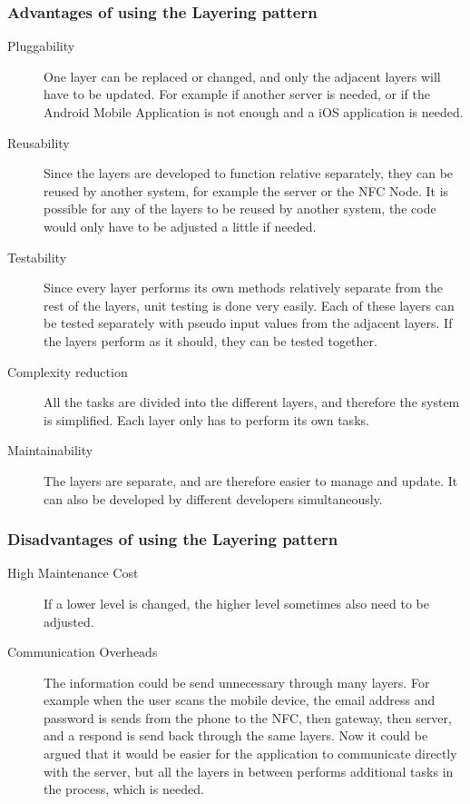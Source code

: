 \subsubsection{Advantages of using the Layering pattern}
\begin{description}
\item[Pluggability] One layer can be replaced or changed, and only the adjacent layers will have to be updated. For example if another server is needed, or if the Android Mobile Application is not enough and a iOS application is needed.
\item[Reusability] Since the layers are developed to function relative separately, they can be reused by another system, for example the server or the NFC Node. It is possible for any of the layers to be reused by another system, the code would only have to be adjusted a little if needed.  
\item[Testability] Since every layer performs its own methods relatively separate from the rest of the layers, unit testing is done very easily. Each of these layers can be tested separately with pseudo input values from the adjacent layers. If the layers perform as it should, they can be tested together.
\item[Complexity reduction] All the tasks are divided into the different layers, and therefore the system is simplified. Each layer only has to perform its own tasks.

\item[Maintainability] The layers are separate, and are therefore easier to manage and update. It can also be developed by different developers simultaneously. 
\end{description}
\subsubsection{Disadvantages of using the Layering pattern}
\begin{description}
\item[High Maintenance Cost] If a lower level is changed, the higher level sometimes also need to be adjusted.
\item[Communication Overheads] The information could be send  unnecessary through many layers. For example when the user scans the mobile device, the email address and password is sends from the phone to the NFC, then gateway, then server, and a respond is send back through the same layers. Now it could be argued that it would be easier for the application to communicate directly with the server, but all the layers in between performs additional tasks in the process, which is needed.

\end{description}

